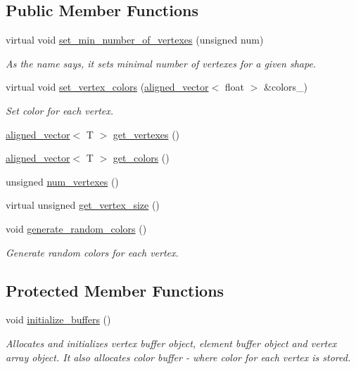 \subsection*{Public Member Functions}
\begin{DoxyCompactItemize}
\item 
virtual void \mbox{\hyperlink{classShape_ac5a35fe1b2ecb8fcfc050a31c8969805}{set\+\_\+min\+\_\+number\+\_\+of\+\_\+vertexes}} (unsigned num)
\begin{DoxyCompactList}\small\item\em As the name says, it sets minimal number of vertexes for a given shape. \end{DoxyCompactList}\item 
virtual void \mbox{\hyperlink{classShape_a69dabd50440dba1ac463ad6819cdb506}{set\+\_\+vertex\+\_\+colors}} (\mbox{\hyperlink{type__definitions_8hpp_accb98a876f193a416d9c8a02fe22d526}{aligned\+\_\+vector}}$<$ float $>$ \&colors\+\_\+)
\begin{DoxyCompactList}\small\item\em Set color for each vertex. \end{DoxyCompactList}\item 
\mbox{\hyperlink{type__definitions_8hpp_accb98a876f193a416d9c8a02fe22d526}{aligned\+\_\+vector}}$<$ T $>$ \mbox{\hyperlink{classShape_a3729bbdd0c4e4f3379498734807bb545}{get\+\_\+vertexes}} ()
\item 
\mbox{\hyperlink{type__definitions_8hpp_accb98a876f193a416d9c8a02fe22d526}{aligned\+\_\+vector}}$<$ T $>$ \mbox{\hyperlink{classShape_aabe9bd208b0ece9824cb45deccc11ba7}{get\+\_\+colors}} ()
\item 
unsigned \mbox{\hyperlink{classShape_a131e85c7f5cad85bffb92e6719117cab}{num\+\_\+vertexes}} ()
\item 
virtual unsigned \mbox{\hyperlink{classShape_a58713d8cf7c4175e7c76eae75c94bc13}{get\+\_\+vertex\+\_\+size}} ()
\item 
void \mbox{\hyperlink{classShape_aabeb601fe95b412987d5b5c276bf8a7a}{generate\+\_\+random\+\_\+colors}} ()
\begin{DoxyCompactList}\small\item\em Generate random colors for each vertex. \end{DoxyCompactList}\end{DoxyCompactItemize}
\subsection*{Protected Member Functions}
\begin{DoxyCompactItemize}
\item 
void \mbox{\hyperlink{classShape_a8b4f54a694871f9d131fdd105e1ca709}{initialize\+\_\+buffers}} ()
\begin{DoxyCompactList}\small\item\em Allocates and initializes vertex buffer object, element buffer object and vertex array object. It also allocates color buffer -\/ where color for each vertex is stored. \end{DoxyCompactList}\end{DoxyCompactItemize}
